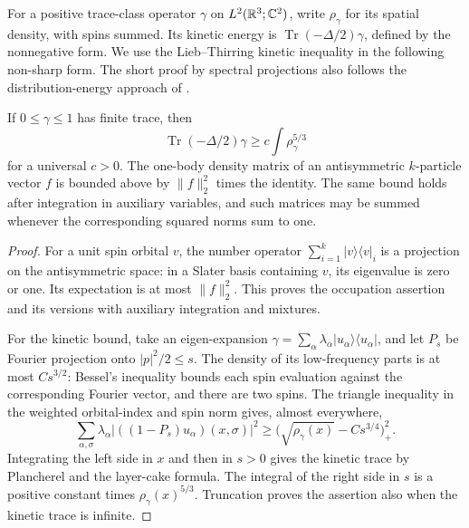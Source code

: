 For a positive trace-class operator $\gamma$ on
$L^2(\mathbb R^3;\mathbb C^2)$, write $\rho_\gamma$ for its spatial density,
with spins summed.  Its kinetic energy is
$\operatorname{Tr}(-\Delta/2)\gamma$, defined by the nonnegative form.
We use the Lieb--Thirring kinetic inequality \citep{LiebThirring1975}
in the following non-sharp form.  The short proof by spectral projections
also follows the distribution-energy approach of \citet{Rumin2011}.

\begin{lemma}
\label{lem:loc-kinetic}
If $0\leq\gamma\leq1$ has finite trace, then
\begin{equation}\label{eq:loc-coarse-kinetic}
 \operatorname{Tr}(-\Delta/2)\gamma
 \geq c\int\rho_\gamma^{5/3}
\end{equation}
for a universal $c>0$.  The one-body density matrix of an
antisymmetric $k$-particle vector $f$ is bounded above by
$\|f\|_2^2$ times the identity.  The same bound holds after
integration in auxiliary variables, and such matrices may be summed
whenever the corresponding squared norms sum to one.
\end{lemma}

\begin{proof}
For a unit spin orbital $v$, the number operator
$\sum_{i=1}^k|v\rangle\langle v|_i$ is a projection on the
antisymmetric space: in a Slater basis containing $v$, its eigenvalue
is zero or one.  Its expectation is at most $\|f\|_2^2$.  This
proves the occupation assertion and its versions with auxiliary
integration and mixtures.

For the kinetic bound, take an eigen-expansion
$\gamma=\sum_\alpha\lambda_\alpha
 |u_\alpha\rangle\langle u_\alpha|$, and let $P_s$ be Fourier
projection onto $|p|^2/2\leq s$.  The density of its low-frequency
parts is at most $Cs^{3/2}$: Bessel's inequality bounds each spin
evaluation against the corresponding Fourier vector, and there are
two spins.  The triangle inequality in the weighted orbital-index
and spin norm gives, almost everywhere,
\[
 \sum_{\alpha,\sigma}\lambda_\alpha
       |((1-P_s)u_\alpha)(x,\sigma)|^2
 \geq\big(\sqrt{\rho_\gamma(x)}-Cs^{3/4}\big)_+^2.
\]
Integrating the left side in $x$ and then in $s>0$ gives the kinetic
trace by Plancherel and the layer-cake formula.  The integral of the
right side in $s$ is a positive constant times
$\rho_\gamma(x)^{5/3}$.  Truncation proves the assertion also when
the kinetic trace is infinite.
\end{proof}


